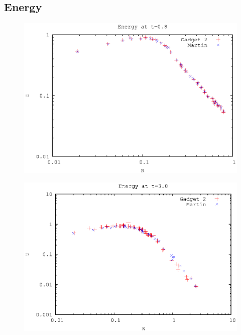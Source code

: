 \documentclass[11pt,a4paper]{article} %
\begin{document}
\subsection*{Energy}
\begin{figure}[H]
\centering
\includegraphics[width=\textwidth]{logu0.8.eps}
\end{figure}

\begin{figure}[H]
\centering
\includegraphics[width=\textwidth]{logu3.0.eps}
\end{figure}
\end{document}
